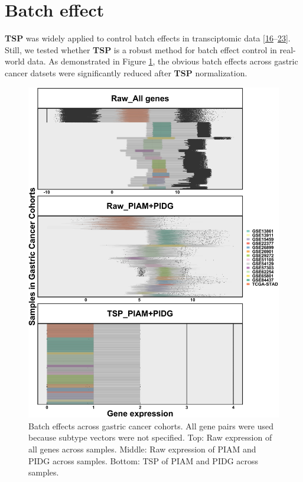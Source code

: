 \documentclass[
  12pt,
]{book}
\begin{document}
\hypertarget{batch-effect}{%
\section{Batch effect}\label{batch-effect}}

\textbf{TSP} was widely applied to control batch effects in transciptomic data {[}\protect\hyperlink{ref-RN369}{16}--\protect\hyperlink{ref-RN365}{23}{]}. Still, we tested whether \textbf{TSP} is a robust method for batch effect control in real-world data. As demonstrated in Figure \ref{fig:be01}, the obvious batch effects across gastric cancer datsets were significantly reduced after \textbf{TSP} normalization.

\begin{figure}

{\centering \includegraphics[width=0.9\linewidth]{./fig/bactch-effect-01} 

}

\caption{Batch effects across gastric cancer cohorts. All gene pairs were used because subtype vectors were not specified. Top: Raw expression of all genes across samples. Middle: Raw expression of PIAM and PIDG across samples. Bottom: TSP of PIAM and PIDG across samples.}\label{fig:be01}
\end{figure}
\end{document}
